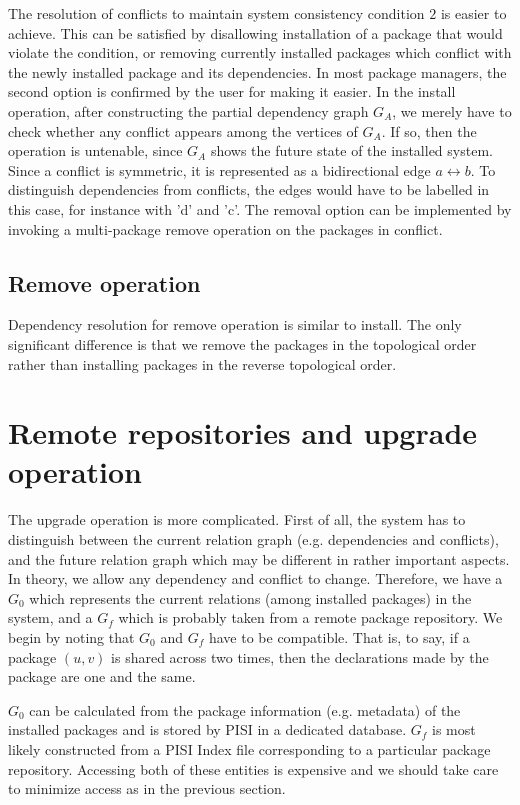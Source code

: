 \documentclass[a4paper,11pt]{article}
\begin{document}
The resolution of conflicts to maintain system consistency condition
$2$ is easier to achieve. This can be satisfied by disallowing
installation of a package that would violate the condition, or
removing currently installed packages which conflict with the newly
installed package and its dependencies. In most package managers, the
second option is confirmed by the user for making it easier. In the
install operation, after constructing the partial dependency graph
$G_A$, we merely have to check whether any conflict appears among the
vertices of $G_A$. If so, then the operation is untenable, since $G_A$
shows the future state of the installed system. Since a conflict is
symmetric, it is represented as a bidirectional edge $a \leftrightarrow b$. To
distinguish dependencies from conflicts, the edges would have to be
labelled in this case, for instance with 'd' and 'c'. The removal
option can be implemented by invoking a multi-package remove operation
on the packages in conflict.

\subsection{Remove operation}

Dependency resolution for remove operation is similar to install.  The
only significant difference is that we remove the packages in the
topological order rather than installing packages in the reverse
topological order.

\section{Remote repositories and upgrade operation}
 

The upgrade operation is more complicated. First of all, the system
has to distinguish between the current relation graph (e.g.
dependencies and conflicts), and the future relation graph which may
be different in rather important aspects. In theory, we allow any
dependency and conflict to change. Therefore, we have a $G_0$ which
represents the current relations (among installed packages) in the
system, and a $G_f$ which is probably taken from a remote package
repository. We begin by noting that $G_0$ and $G_f$ have to be
compatible. That is, to say, if a package $(u,v)$ is shared across two
times, then the declarations made by the package are one and the same.

$G_0$ can be calculated from the package information (e.g. metadata)
of the installed packages and is stored by PISI in a dedicated
database. $G_f$ is most likely constructed from a PISI Index file
corresponding to a particular package repository. Accessing both of
these entities is expensive and we should take care to minimize access
as in the previous section.
\end{document}

